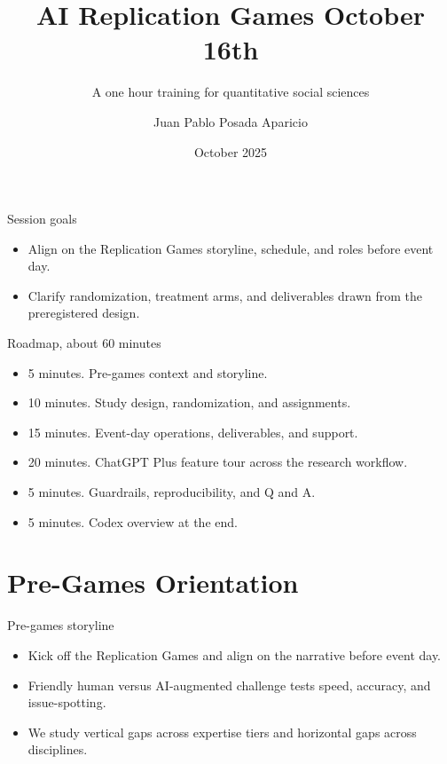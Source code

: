 \documentclass[aspectratio=169,professionalfonts]{beamer}
\title{AI Replication Games October 16th}
\subtitle{A one hour training for quantitative social sciences}
\author{Juan Pablo Posada Aparicio}
\institute{Institute for Replication, University of Ottawa}
\date{October 2025}
\begin{document}
\begin{frame}
  \titlepage
\end{frame}

\begin{frame}{Session goals}
  \begin{itemize}
    \item Align on the Replication Games storyline, schedule, and roles before event day.
    \item Clarify randomization, treatment arms, and deliverables drawn from the preregistered design.
  \end{itemize}
\end{frame}

\begin{frame}{Roadmap, about 60 minutes}
  \begin{itemize}
    \item 5 minutes. Pre-games context and storyline.
    \item 10 minutes. Study design, randomization, and assignments.
    \item 15 minutes. Event-day operations, deliverables, and support.
    \item 20 minutes. ChatGPT Plus feature tour across the research workflow.
    \item 5 minutes. Guardrails, reproducibility, and Q and A.
    \item 5 minutes. Codex overview at the end.
  \end{itemize}
\end{frame}

\section{Pre-Games Orientation}

\begin{frame}{Pre-games storyline}
  \begin{itemize}
    \item Kick off the Replication Games and align on the narrative before event day.
    \item Friendly human versus AI-augmented challenge tests speed, accuracy, and issue-spotting.
    \item We study vertical gaps across expertise tiers and horizontal gaps across disciplines.
  \end{itemize}
\end{frame}
\end{document}

